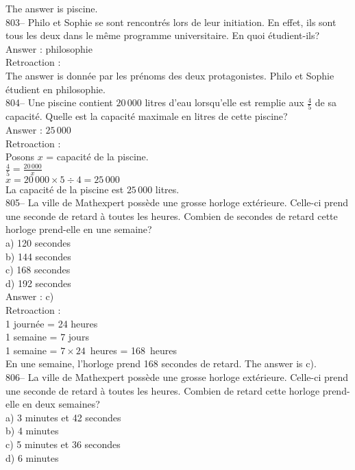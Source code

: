 ﻿\documentclass[letterpaper, 12pt]{article}
\begin{document}
The answer is piscine.\\

803-- Philo et Sophie se sont rencontr\'es lors de leur initiation. En
effet, ils sont tous les deux dans le m\^eme programme universitaire.  En
quoi \'etudient-ils?\\

Answer : philosophie\\

Retroaction : \\
The answer is donn\'ee par les pr\'enoms des deux protagonistes.  Philo
et Sophie \'etudient en philosophie.\\

804-- Une piscine contient $20\,000$ litres d'eau lorsqu'elle est remplie
aux $\frac{4}{5}$ de sa capacit\'e. Quelle est la capacit\'e maximale en
litres de cette piscine?\\

Answer : $25\,000$\\

Retroaction : \\
Posons $x$ = capacit\'e de la piscine.\\
$\frac{4}{5}=\frac{20\,000}{x}$\\
$x=20\,000\times5\div4=25\,000$\\
La capacit\'e de la piscine est $25\,000$ litres.\\

805-- La ville de Mathexpert poss\`ede une grosse horloge ext\'erieure.
Celle-ci prend une seconde de retard \`a toutes les heures.  Combien de
secondes de retard cette horloge prend-elle en une semaine?\\
a) 120 secondes\\
b) 144 secondes\\
c) 168 secondes\\
d) 192 secondes\\

Answer : c)\\

Retroaction : \\
1 journ\'ee = 24 heures\\
1 semaine = 7 jours\\
1 semaine = $7\times24$~heures = 168~heures\\
En une semaine, l'horloge prend 168 secondes de retard.  The answer is
c).\\

806-- La ville de Mathexpert poss\`ede une grosse horloge ext\'erieure.
Celle-ci prend une seconde de retard \`a toutes les heures.  Combien de
retard cette horloge prend-elle en deux semaines?\\
a) 3 minutes et 42 secondes\\
b) 4 minutes\\
c) 5 minutes et 36 secondes\\
d) 6 minutes\\
\end{document}
